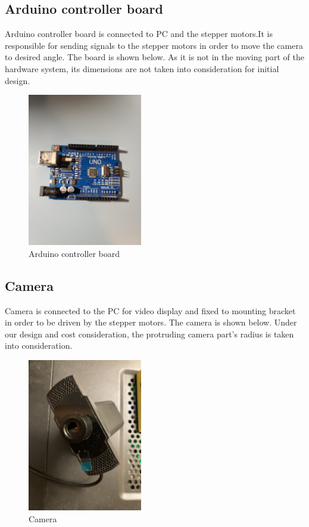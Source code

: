 \documentclass[12pt, titlepage]{article}
\begin{document}
\subsection{Arduino controller board}
Arduino controller board is connected to PC and the stepper motors.It is responsible for sending signals to the stepper motors in order to move the camera to desired angle. The board is shown below. As it is not in the moving part of the hardware system, its dimensions are not taken into consideration for initial design.
\begin{figure}[H]
\caption{Arduino controller board}
\centering
\includegraphics[width=5cm]{board}
\end{figure}
\subsection{Camera}
Camera is connected to the PC for video display and fixed to mounting bracket in order to be driven by the stepper motors. The camera is shown below. Under our design and cost consideration, the protruding camera part's radius is taken into consideration.
\begin{figure}[H]
\caption{Camera}
\centering
\includegraphics[width=5cm]{camera.jpg}
\end{figure}
\end{document}
